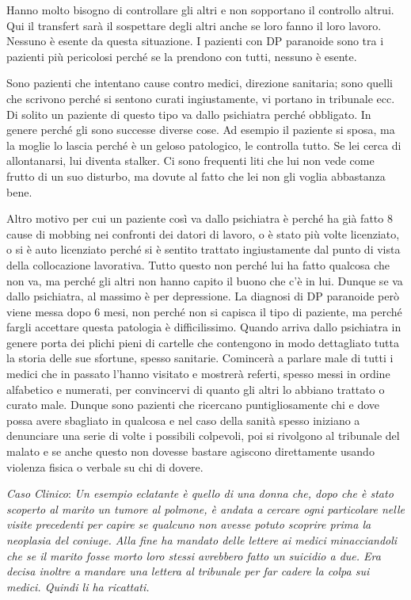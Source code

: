 Hanno molto bisogno di controllare gli altri e non sopportano il
controllo altrui. Qui il transfert sarà il sospettare degli altri anche
se loro fanno il loro lavoro. Nessuno è esente da questa situazione. I
pazienti con DP paranoide sono tra i pazienti più pericolosi perché se
la prendono con tutti, nessuno è esente.

Sono pazienti che intentano cause contro medici, direzione sanitaria;
sono quelli che scrivono perché si sentono curati ingiustamente, vi
portano in tribunale ecc. Di solito un paziente di questo tipo va dallo
psichiatra perché obbligato. In genere perché gli sono successe diverse
cose. Ad esempio il paziente si sposa, ma la moglie lo lascia perché è
un geloso patologico, le controlla tutto. Se lei cerca di allontanarsi,
lui diventa stalker. Ci sono frequenti liti che lui non vede come frutto
di un suo disturbo, ma dovute al fatto che lei non gli voglia abbastanza
bene.

Altro motivo per cui un paziente così va dallo psichiatra è perché ha
già fatto 8 cause di mobbing nei confronti dei datori di lavoro, o è
stato più volte licenziato, o si è auto licenziato perché si è sentito
trattato ingiustamente dal punto di vista della collocazione lavorativa.
Tutto questo non perché lui ha fatto qualcosa che non va, ma perché gli
altri non hanno capito il buono che c'è in lui. Dunque se va dallo
psichiatra, al massimo è per depressione. La diagnosi di DP paranoide
però viene messa dopo 6 mesi, non perché non si capisca il tipo di
paziente, ma perché fargli accettare questa patologia è difficilissimo.
Quando arriva dallo psichiatra in genere porta dei plichi pieni di
cartelle che contengono in modo dettagliato tutta la storia delle sue
sfortune, spesso sanitarie. Comincerà a parlare male di tutti i medici
che in passato l'hanno visitato e mostrerà referti, spesso messi in
ordine alfabetico e numerati, per convincervi di quanto gli altri lo
abbiano trattato o curato male. Dunque sono pazienti che ricercano
puntigliosamente chi e dove possa avere sbagliato in qualcosa e nel caso
della sanità spesso iniziano a denunciare una serie di volte i possibili
colpevoli, poi si rivolgono al tribunale del malato e se anche questo
non dovesse bastare agiscono direttamente usando violenza fisica o
verbale su chi di dovere.

\emph{Caso Clinico}: \emph{Un esempio eclatante è quello di una donna
che, dopo che è stato scoperto al marito un tumore al polmone, è andata
a cercare ogni particolare nelle visite precedenti per capire se
qualcuno non avesse potuto scoprire prima la neoplasia del coniuge. Alla
fine ha mandato delle lettere ai medici minacciandoli che se il marito
fosse morto loro stessi avrebbero fatto un suicidio a due. Era decisa
inoltre a mandare una lettera al tribunale per far cadere la colpa sui
medici. Quindi li ha ricattati.}

